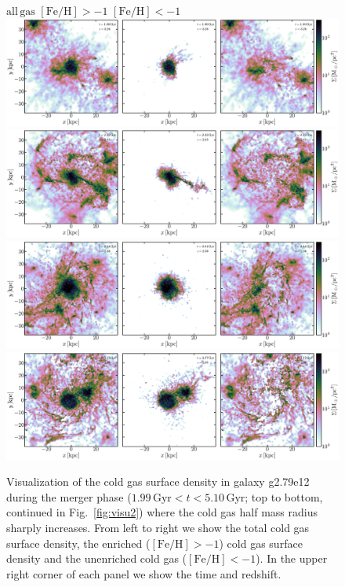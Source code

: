\documentclass[useAMS,usenatbib]{mnras}
\begin{document}
\begin{figure}
    \begin{centering}
    \hspace*{.5em} $\mathrm{all\, gas}$ \hspace*{12.5em} $\mathrm{[Fe/H]}>-1$ \hspace*{12.em} $\mathrm{[Fe/H]}<-1$ 
     \includegraphics[width=.99\linewidth]{../static/frame0019.pdf}
     \includegraphics[width=.99\linewidth]{../static/frame0027.pdf}
     \includegraphics[width=.99\linewidth]{../static/frame0038.pdf}
     \includegraphics[width=.99\linewidth]{../static/frame0044.pdf}
     \vspace*{-1.em}
     \caption{
      Visualization of the cold gas surface density in galaxy g2.79e12 during the merger phase ($1.99\, \mathrm{Gyr} < t < 5.10\, \mathrm{Gyr}$; top to bottom, continued in Fig.~\ref{fig:visu2}) where the cold gas half mass radius sharply increases. From left to right we show the total cold gas surface density, the enriched ($\mathrm{[Fe/H]}>-1$) cold gas surface density and the unenriched cold gas ($\mathrm{[Fe/H]}<-1$). In the upper right corner of each panel we show the time and redshift.     
     }
     \label{fig:visu}
    \end{centering}
\end{figure}
\end{document}
